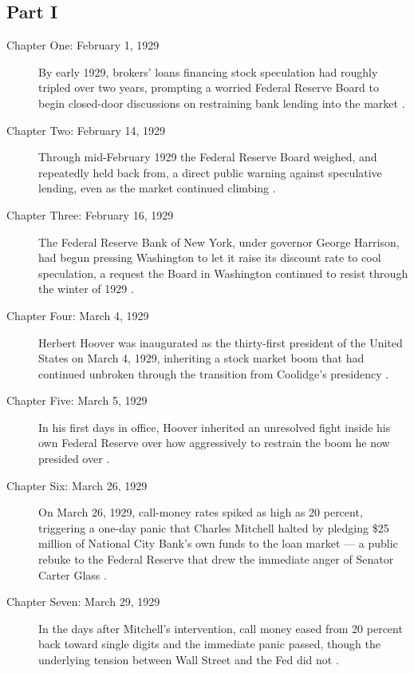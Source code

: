 \documentclass[11pt]{article}
\begin{document}
\subsection*{Part I}

\begin{description}

\item[Chapter One: February 1, 1929] By early 1929, brokers' loans financing
stock speculation had roughly tripled over two years, prompting a worried
Federal Reserve Board to begin closed-door discussions on restraining bank
lending into the market \autocite{fedhistorycrash}.

\item[Chapter Two: February 14, 1929] Through mid-February 1929 the Federal
Reserve Board weighed, and repeatedly held back from, a direct public warning
against speculative lending, even as the market continued climbing
\autocite{fedhistorycrash}.

\item[Chapter Three: February 16, 1929] The Federal Reserve Bank of New York,
under governor George Harrison, had begun pressing Washington to let it raise
its discount rate to cool speculation, a request the Board in Washington
continued to resist through the winter of 1929 \autocite{fedhistorycrash}.

\item[Chapter Four: March 4, 1929] Herbert Hoover was inaugurated as the
thirty-first president of the United States on March 4, 1929, inheriting a
stock market boom that had continued unbroken through the transition from
Coolidge's presidency \autocite{crashwiki}.

\item[Chapter Five: March 5, 1929] In his first days in office, Hoover
inherited an unresolved fight inside his own Federal Reserve over how
aggressively to restrain the boom he now presided over \autocite{fedhistorycrash}.

\item[Chapter Six: March 26, 1929] On March 26, 1929, call-money rates spiked
as high as 20 percent, triggering a one-day panic that Charles Mitchell halted
by pledging \$25 million of National City Bank's own funds to the loan market
--- a public rebuke to the Federal Reserve that drew the immediate anger of
Senator Carter Glass \autocite{mitchellmarch1929}.

\item[Chapter Seven: March 29, 1929] In the days after Mitchell's
intervention, call money eased from 20 percent back toward single digits and
the immediate panic passed, though the underlying tension between Wall Street
and the Fed did not \autocite{mitchellmarch1929}.


\end{description}
\end{document}
